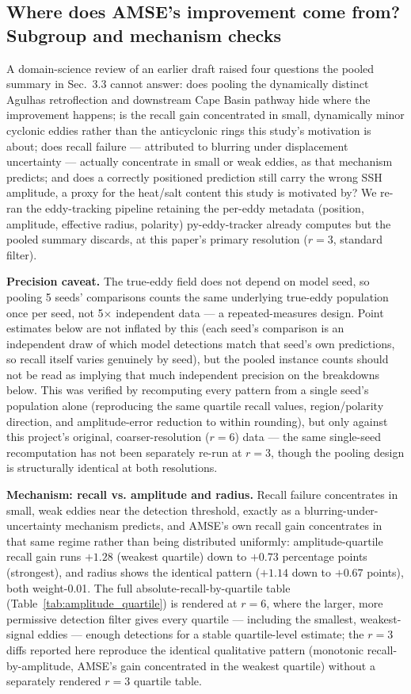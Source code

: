 \documentclass[11pt]{article}
\begin{document}
\subsection{Where does AMSE's improvement come from? Subgroup and mechanism checks}

A domain-science review of an earlier draft raised four questions the pooled summary in Sec.~3.3 cannot answer: does pooling the dynamically distinct Agulhas retroflection and downstream Cape Basin pathway hide where the improvement happens; is the recall gain concentrated in small, dynamically minor cyclonic eddies rather than the anticyclonic rings this study's motivation is about; does recall failure --- attributed to blurring under displacement uncertainty --- actually concentrate in small or weak eddies, as that mechanism predicts; and does a correctly positioned prediction still carry the wrong SSH amplitude, a proxy for the heat/salt content this study is motivated by? We re-ran the eddy-tracking pipeline retaining the per-eddy metadata (position, amplitude, effective radius, polarity) py-eddy-tracker already computes but the pooled summary discards, at this paper's primary resolution ($r=3$, standard filter).

\textbf{Precision caveat.} The true-eddy field does not depend on model seed, so pooling 5 seeds' comparisons counts the same underlying true-eddy population once per seed, not 5$\times$ independent data --- a repeated-measures design. Point estimates below are not inflated by this (each seed's comparison is an independent draw of which model detections match that seed's own predictions, so recall itself varies genuinely by seed), but the pooled instance counts should not be read as implying that much independent precision on the breakdowns below. This was verified by recomputing every pattern from a single seed's population alone (reproducing the same quartile recall values, region/polarity direction, and amplitude-error reduction to within rounding), but only against this project's original, coarser-resolution ($r=6$) data --- the same single-seed recomputation has not been separately re-run at $r=3$, though the pooling design is structurally identical at both resolutions.

\textbf{Mechanism: recall vs. amplitude and radius.} Recall failure concentrates in small, weak eddies near the detection threshold, exactly as a blurring-under-uncertainty mechanism predicts, and AMSE's own recall gain concentrates in that same regime rather than being distributed uniformly: amplitude-quartile recall gain runs $+1.28$ (weakest quartile) down to $+0.73$ percentage points (strongest), and radius shows the identical pattern ($+1.14$ down to $+0.67$ points), both weight-0.01. The full absolute-recall-by-quartile table (Table~\ref{tab:amplitude_quartile}) is rendered at $r=6$, where the larger, more permissive detection filter gives every quartile --- including the smallest, weakest-signal eddies --- enough detections for a stable quartile-level estimate; the $r=3$ diffs reported here reproduce the identical qualitative pattern (monotonic recall-by-amplitude, AMSE's gain concentrated in the weakest quartile) without a separately rendered $r=3$ quartile table.
\end{document}
